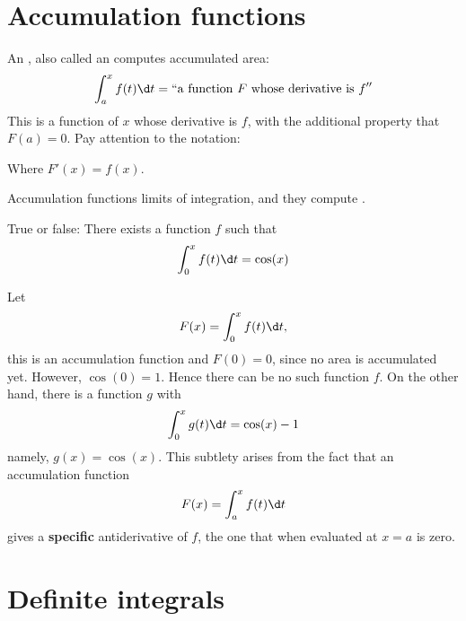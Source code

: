 \documentclass{ximera}
\begin{document}
\section{Accumulation functions}

An , also called an 
computes accumulated area:
\[
\int_a^x f(t) \d t = ``\text{a function $F$ whose derivative is $f$}''
\]
This is a function of $x$ whose derivative is $f$, with the additional
property that $F(a)=0$.  Pay attention to the notation:
\begin{image}
\end{image}
Where $F'(x) = f(x)$.
\begin{explanation}%
  Accumulation functions  limits of integration, and they compute
  .
\end{explanation}
\begin{question}
  True or false: There exists a function $f$ such that 
  \[
  \int_0^x f(t) \d t = \cos(x)
  \]
  \begin{multipleChoice}
  \end{multipleChoice}
  \begin{feedback}
    Let
    \[
    F(x) = \int_0^x f(t) \d t,
    \]
    this is an accumulation function and $F(0) = 0$, since no area is
    accumulated yet. However, $\cos(0) =1$. Hence there can be no such
    function $f$. On the other hand, there is a function $g$ with
     \[
     \int_0^x g(t) \d t = \cos(x)-1
     \]
     namely, $g(x) = \cos(x)$. This subtlety arises from the fact that an
     accumulation function
     \[
     F(x) = \int_a^x f(t) \d t
     \]
     gives a \textbf{specific} antiderivative of $f$, the one that
     when evaluated at $x=a$ is zero.
  \end{feedback}
\end{question}










\section{Definite integrals}
\end{document}
